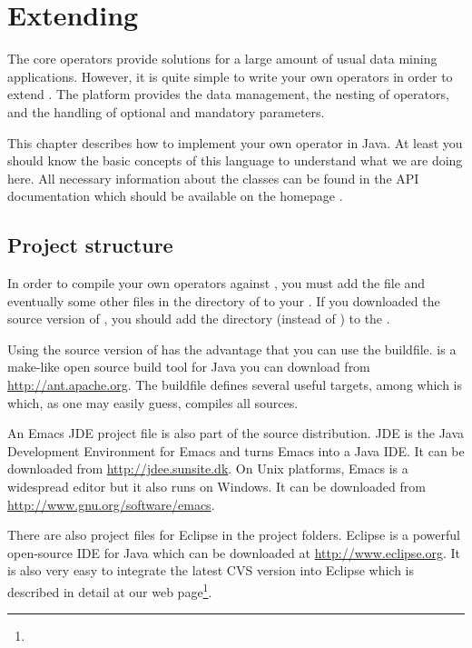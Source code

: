 \chapter{Extending \rapidminer}
\label{sec:extending_rapidminer}

The core \rapidminer operators provide solutions for a large amount of usual
data mining applications. However, it is quite simple to write your own 
operators in order to extend \rapidminer. The platform provides the data management,
the nesting of operators, and the handling of optional and mandatory
parameters.

This chapter describes how to implement your own \rapidminer
operator in Java. At least you should know the basic
concepts of this language to understand what we are doing here. All
necessary information about the \rapidminer classes can be found in the \rapidminer
API documentation which should be available on the \rapidminer homepage \rapidminerurl.


\section{Project structure}
In order to compile your own operators against \rapidminer, you must add
the file  and eventually some other  files in the
 directory of \rapidminer to your . If
you downloaded the source version of \rapidminer, you should add the
 directory (instead of ) to the
. 

Using the source version of \rapidminer has the advantage that you can use
the  buildfile.  is a make-like
open source build tool for Java you can download from
\url{http://ant.apache.org}. The buildfile defines several useful
targets, among which is  which, as one may
easily guess, compiles all sources.

An Emacs JDE project file is also part of the source distribution. JDE
is the Java Development Environment for Emacs and turns Emacs into a
Java IDE. It can be downloaded from
\url{http://jdee.sunsite.dk}. On Unix platforms, Emacs is a widespread
editor but it also runs on Windows. It can be downloaded from
\url{http://www.gnu.org/software/emacs}.

There are also project files for Eclipse in the project folders. Eclipse is a 
powerful open-source IDE for Java which can be downloaded at \url{http://www.eclipse.org}.
It is also very easy to integrate the latest CVS version into Eclipse which is
described in detail at our web page\footnote{\rapidminerurl}.



